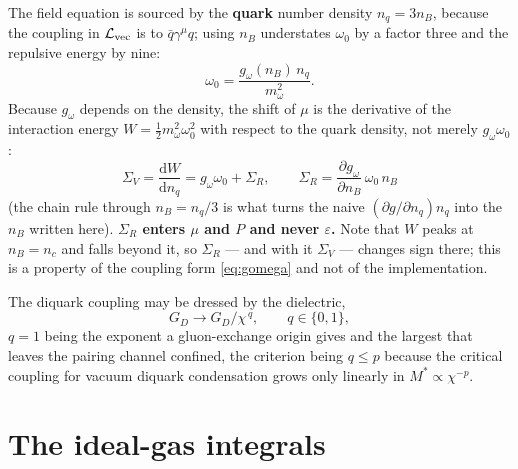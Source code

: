 \documentclass[11pt,a4paper]{article}
\newcommand{\Mstar}{M^{*}}
\begin{document}
The field equation is sourced by the \textbf{quark} number density
$n_q=3n_B$, because the coupling in $\mathcal L_{\rm vec}$ is to
$\bar q\gamma^\mu q$; using $n_B$ understates $\omega_0$ by a factor three and
the repulsive energy by nine:
\begin{equation}
\omega_0 = \frac{g_\omega(n_B)\,n_q}{m_\omega^2}.
\label{eq:omega}
\end{equation}
Because $g_\omega$ depends on the density, the shift of $\mu$ is the derivative
of the interaction energy $W=\tfrac12 m_\omega^2\omega_0^2$ with respect to the
quark density, not merely $g_\omega\omega_0$:
\begin{equation}
\boxed{\;
\Sigma_V = \frac{\mathrm dW}{\mathrm dn_q}
 = g_\omega\omega_0 + \Sigma_R,
\qquad
\Sigma_R = \frac{\partial g_\omega}{\partial n_B}\,\omega_0\,n_B \;}
\label{eq:SigmaR}
\end{equation}
(the chain rule through $n_B=n_q/3$ is what turns the naive
$(\partial g/\partial n_q)n_q$ into the $n_B$ written here).
\textbf{$\Sigma_R$ enters $\mu$ and $P$ and never $\varepsilon$.} Note that
$W$ peaks at $n_B=n_c$ and falls beyond it, so $\Sigma_R$ --- and with it
$\Sigma_V$ --- changes sign there; this is a property of the coupling form
\eqref{eq:gomega} and not of the implementation.

The diquark coupling may be dressed by the dielectric,
\begin{equation}
G_D \longrightarrow G_D/\chi^{\,q},\qquad q\in\{0,1\},
\label{eq:GDdress}
\end{equation}
$q=1$ being the exponent a gluon-exchange origin gives and the largest that
leaves the pairing channel confined, the criterion being $q\le p$ because the
critical coupling for vacuum diquark condensation grows only linearly in
$\Mstar\propto\chi^{-p}$.

\section{The ideal-gas integrals}
\label{sec:integrals}
\end{document}
